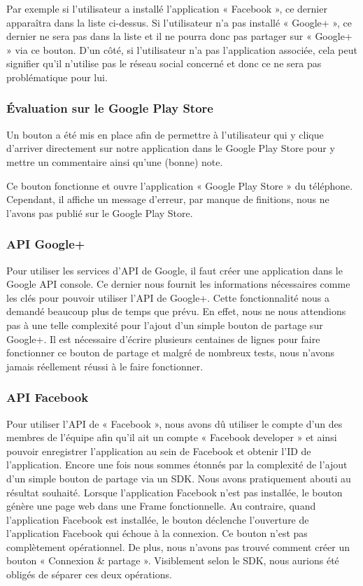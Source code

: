 \documentclass{report}
\begin{document}
Par exemple si l’utilisateur a installé l’application « Facebook », ce
dernier apparaîtra dans la liste ci-dessus. Si l’utilisateur n’a pas
installé « Google+ », ce dernier ne sera pas dans la liste et il ne
pourra donc pas partager sur « Google+ » via ce bouton. D’un côté, si
l’utilisateur n’a pas l’application associée, cela peut signifier qu’il
n’utilise pas le réseau social concerné et donc ce ne sera pas
problématique pour lui.

\subsubsection{Évaluation sur le Google Play Store}

Un bouton a été mis en place afin de permettre à l’utilisateur qui y
clique d’arriver directement sur notre application dans le Google Play
Store pour y mettre un commentaire ainsi qu’une (bonne) note.

Ce bouton fonctionne et ouvre l’application « Google Play Store » du
téléphone. Cependant, il affiche un message d’erreur, par manque de
finitions, nous ne l’avons pas publié sur le Google Play Store.

\subsubsection{API Google+}

Pour utiliser les services d’API de Google, il faut créer une
application dans le Google API console. Ce dernier nous fournit les
informations nécessaires comme les clés pour pouvoir utiliser l’API de
Google+. Cette fonctionnalité nous a demandé beaucoup plus de temps que
prévu. En effet, nous ne nous attendions pas à une telle complexité pour
l’ajout d’un simple bouton de partage sur Google+. Il est nécessaire
d’écrire plusieurs centaines de lignes pour faire fonctionner ce bouton
de partage et malgré de nombreux tests, nous n’avons jamais réellement
réussi à le faire fonctionner.

\subsubsection{API Facebook}

Pour utiliser l’API de « Facebook », nous avons dû utiliser le compte
d’un des membres de l’équipe afin qu’il ait un compte « Facebook
developer » et ainsi pouvoir enregistrer l’application au sein de
Facebook et obtenir l’ID de l’application. Encore une fois nous sommes
étonnés par la complexité de l’ajout d’un simple bouton de partage via un
SDK. Nous avons pratiquement abouti au résultat souhaité. Lorsque
l’application Facebook n’est pas installée, le bouton génère une page
web dans une Frame fonctionnelle. Au contraire, quand l’application
Facebook est installée, le bouton déclenche l’ouverture de l’application
Facebook qui échoue à la connexion. Ce bouton n’est pas complètement
opérationnel. De plus, nous n’avons pas trouvé comment créer un bouton
« Connexion \& partage ». Visiblement selon le SDK, nous aurions été
obligés de séparer ces deux opérations.
\end{document}
